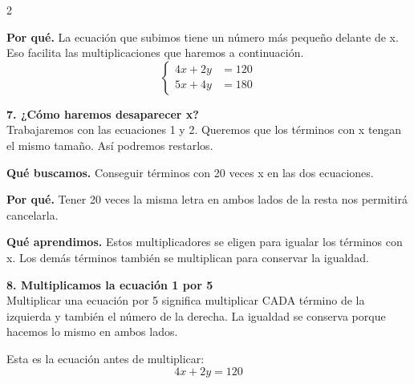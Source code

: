 \documentclass[11pt,a4paper,landscape]{article}
\begin{document}
\begin{multicols*}{2}
\begin{minipage}{\linewidth}
\par\smallskip\textbf{Por qué.} La ecuación que subimos tiene un número más pequeño delante de x. Eso facilita las multiplicaciones que haremos a continuación.
\[\left\{\begin{aligned}4x + 2y &= 120\\5x + 4y &= 180\end{aligned}\right.\]
\end{minipage}\par\medskip
\noindent\begin{minipage}{\linewidth}\textbf{7. ¿Cómo haremos desaparecer x?}\\[2pt]Trabajaremos con las ecuaciones 1 y 2. Queremos que los términos con x tengan el mismo tamaño. Así podremos restarlos.
\par\smallskip\textbf{Qué buscamos.} Conseguir términos con 20 veces x en las dos ecuaciones.
\par\smallskip\textbf{Por qué.} Tener 20 veces la misma letra en ambos lados de la resta nos permitirá cancelarla.
\par{}\par\smallskip
\par\smallskip\textbf{Qué aprendimos.} Estos multiplicadores se eligen para igualar los términos con x. Los demás términos también se multiplican para conservar la igualdad.
\end{minipage}\par\medskip
\noindent\begin{minipage}{\linewidth}\textbf{8. Multiplicamos la ecuación 1 por 5}\\[2pt]Multiplicar una ecuación por 5 significa multiplicar CADA término de la izquierda y también el número de la derecha. La igualdad se conserva porque hacemos lo mismo en ambos lados.
\par\smallskip Esta es la ecuación antes de multiplicar:
\[4x + 2y = 120\]

\end{minipage}
\end{multicols*}
\end{document}

